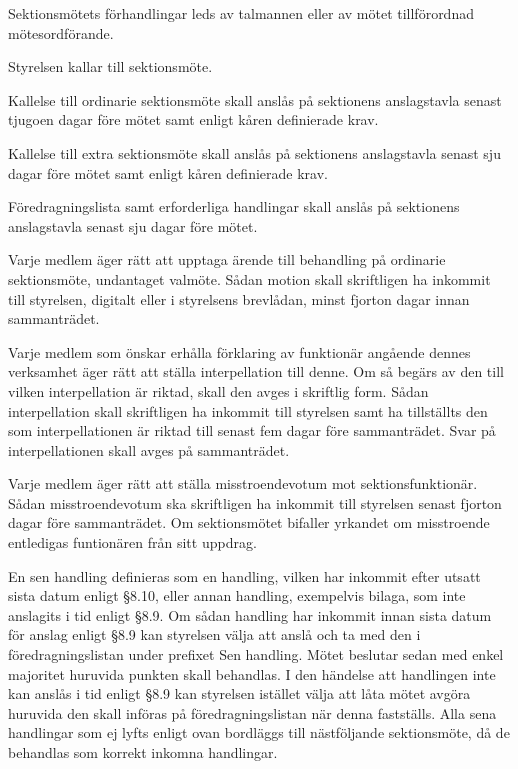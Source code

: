 \documentclass[stadgar]{dsekprotokoll}
\begin{document}
\begin{stadgeavsnitt}

Sektionsmötets förhandlingar leds av talmannen eller av mötet tillförordnad
mötesordförande.


Styrelsen kallar till sektionsmöte.

Kallelse till ordinarie sektionsmöte skall anslås på sektionens anslagstavla senast tjugoen dagar före mötet samt enligt kåren definierade krav.

Kallelse till extra sektionsmöte skall anslås på sektionens anslagstavla senast sju dagar före mötet samt enligt kåren definierade krav.


Föredragningslista samt erforderliga handlingar skall anslås på sektionens anslagstavla
senast sju dagar före mötet.


Varje medlem äger rätt att upptaga ärende till behandling på ordinarie sektionsmöte, undantaget valmöte. Sådan motion skall skriftligen ha inkommit till styrelsen, digitalt eller i styrelsens brevlådan, minst fjorton dagar innan sammanträdet.

Varje medlem som önskar erhålla förklaring av funktionär angående dennes verksamhet äger rätt att ställa interpellation till denne. Om så begärs av den till vilken interpellation är riktad, skall den avges i skriftlig form. Sådan interpellation skall skriftligen ha inkommit till styrelsen samt ha tillställts den som interpellationen är riktad till senast fem dagar före sammanträdet. Svar på interpellationen skall avges på sammanträdet.


Varje medlem äger rätt att ställa misstroendevotum mot sektionsfunktionär. Sådan misstroendevotum ska skriftligen ha inkommit till styrelsen senast fjorton dagar före sammanträdet. Om sektionsmötet bifaller yrkandet om misstroende entledigas funtionären från sitt uppdrag.

En sen handling definieras som en handling, vilken har inkommit efter utsatt sista datum enligt
\S8.10, eller annan handling, exempelvis bilaga, som inte anslagits i tid enligt \S8.9. Om sådan
handling har inkommit innan sista datum för anslag enligt \S8.9 kan styrelsen välja att anslå och
ta med den i föredragningslistan under prefixet Sen handling. Mötet beslutar sedan med enkel
majoritet huruvida punkten skall behandlas. I den händelse att handlingen inte kan anslås i
tid enligt \S8.9 kan styrelsen istället välja att låta mötet avgöra huruvida den skall införas på föredragningslistan
när denna fastställs. Alla sena handlingar som ej lyfts enligt ovan bordläggs
till nästföljande sektionsmöte, då de behandlas som korrekt inkomna handlingar.


\end{stadgeavsnitt}
\end{document}
